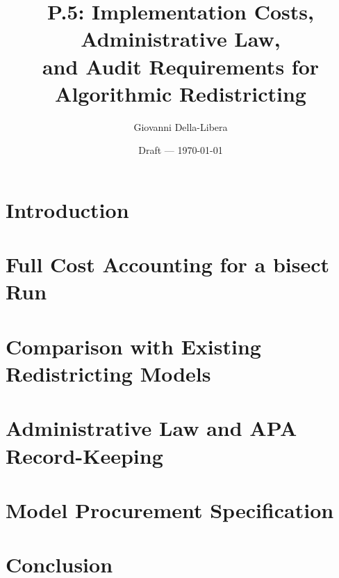 \documentclass[12pt]{article}
\title{P.5: Implementation Costs, Administrative Law,\\
       and Audit Requirements for Algorithmic Redistricting}
\author{Giovanni Della-Libera}
\date{Draft --- \today}
\begin{document}
\maketitle

\begin{abstract}

\end{abstract}

\newpage
\tableofcontents
\newpage

\section{Introduction}


\section{Full Cost Accounting for a bisect Run}


\section{Comparison with Existing Redistricting Models}


\section{Administrative Law and APA Record-Keeping}


\section{Model Procurement Specification}


\section{Conclusion}




\end{document}
